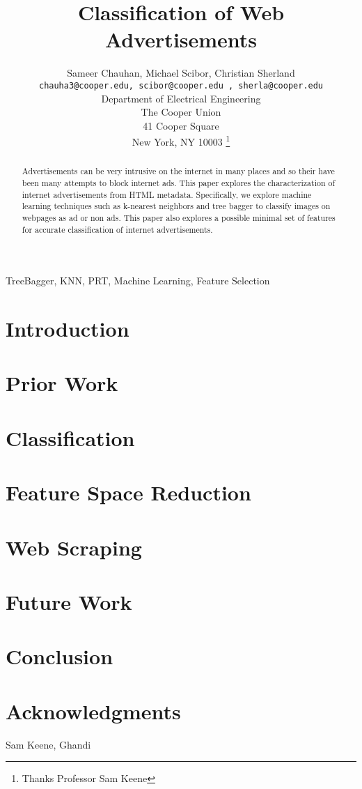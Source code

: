 \documentclass[11pt]{IEEEtran}
\title{Classification of Web Advertisements}
\author{Sameer Chauhan, Michael Scibor, Christian Sherland\\
\texttt{chauha3@cooper.edu, scibor@cooper.edu , sherla@cooper.edu}\\
Department of Electrical Engineering\\
The Cooper Union\\
41 Cooper Square\\
New York, NY 10003
\thanks{ Thanks Professor Sam Keene}}
\begin{document}
\maketitle

\begin{abstract}
Advertisements can be very intrusive on the internet in many places and so their have been many attempts to block internet ads. This paper explores the characterization of internet advertisements from HTML metadata. Specifically, we explore machine learning techniques such as k-nearest neighbors and tree bagger to classify images on webpages as ad or non ads. This paper also explores a possible minimal set of features for accurate classification of internet advertisements.
\end{abstract}

\begin{IEEEkeywords}
TreeBagger, KNN, PRT, Machine Learning, Feature Selection
\end{IEEEkeywords}

\section{Introduction}


\section{Prior Work}


\section{Classification}
\IEEEpubidadjcol


\section{Feature Space Reduction}


\section{Web Scraping}


\section{Future Work}


\section{Conclusion}


\section*{Acknowledgments}
Sam Keene, Ghandi




\end{document}
